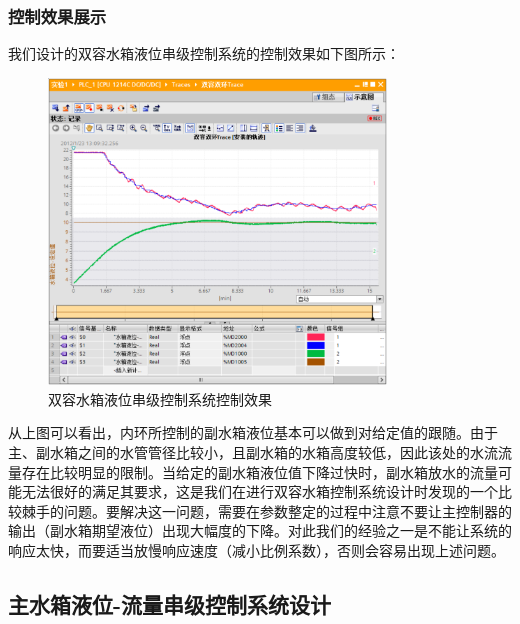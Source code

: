 \documentclass[UTF8]{article}
\begin{document}
\subsubsection{控制效果展示}
我们设计的双容水箱液位串级控制系统的控制效果如下图所示：
\begin{figure}[H]
    \centering %
    \includegraphics[width=0.8\textwidth]{figure/双容水箱控制效果图.png} 
    \caption{双容水箱液位串级控制系统控制效果} %
\end{figure}
从上图可以看出，内环所控制的副水箱液位基本可以做到对给定值的跟随。由于主、副水箱之间的水管管径比较小，且副水箱的水箱高度较低，因此该处的水流流量存在比较明显的限制。当给定的副水箱液位值下降过快时，副水箱放水的流量可能无法很好的满足其要求，这是我们在进行双容水箱控制系统设计时发现的一个比较棘手的问题。要解决这一问题，需要在参数整定的过程中注意不要让主控制器的输出（副水箱期望液位）出现大幅度的下降。对此我们的经验之一是不能让系统的响应太快，而要适当放慢响应速度（减小比例系数），否则会容易出现上述问题。

\subsection{主水箱液位-流量串级控制系统设计}
\end{document}

